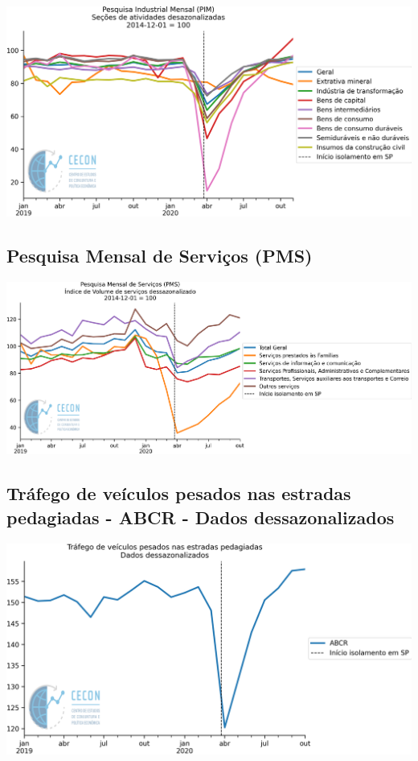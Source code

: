 \documentclass{SelfArx}
\begin{document}
\begin{center}
\includegraphics[width=.9\linewidth]{./figs/Setoriais/PIM_IBGE.png}
\end{center}


\subsection*{Pesquisa Mensal de Serviços (PMS)}
\label{sec:org7ff6570}

\begin{center}
\includegraphics[width=.9\linewidth]{./figs/Setoriais/PMS_IBGE.png}
\end{center}

\subsection*{Tráfego de veículos pesados nas estradas pedagiadas - ABCR - Dados dessazonalizados}
\label{sec:org544aefc}


\begin{center}
\includegraphics[width=.9\linewidth]{./figs/Setoriais/TrafegoPedagio.png}
\end{center}
\end{document}
